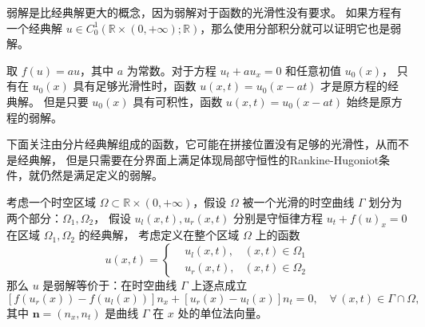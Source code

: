 弱解是比经典解更大的概念，因为弱解对于函数的光滑性没有要求。
如果方程有一个经典解 $u \in C_0^1(\mathbb{R}\times(0,+\infty);\mathbb{R})$，那么使用分部积分就可以证明它也是弱解。

\begin{example}
    取 $f(u) = a u$，其中 $a$ 为常数。对于方程 $u_t + a u_x = 0$ 和任意初值 $u_0(x)$，
    只有在 $u_0(x)$ 具有足够光滑性时，函数 $u(x,t) = u_0(x - a t)$ 才是原方程的经典解。
    但是只要 $u_0(x)$ 具有可积性，函数 $u(x,t) = u_0(x - a t)$ 始终是原方程的弱解。
\end{example}



下面关注由分片经典解组成的函数，它可能在拼接位置没有足够的光滑性，从而不是经典解，
但是只需要在分界面上满足体现局部守恒性的Rankine-Hugoniot条件，就仍然是满足定义的弱解。

\begin{theorem}\label{thm:rh-jump}
    考虑一个时空区域 $\Omega \subset \mathbb{R} \times (0,+\infty)$，假设 $\Omega$ 被一个光滑的时空曲线 $\Gamma$ 划分为两个部分：$\Omega_1,\Omega_2$，
    假设 $u_l(x,t),u_r(x,t)$ 分别是守恒律方程 $u_t + f(u)_x = 0$ 在区域 $\Omega_1,\Omega_2$ 的经典解，
    考虑定义在整个区域 $\Omega$ 上的函数
    \[
        u(x,t) =
        \left\{
        \begin{aligned}
             & u_l(x,t), & (x,t) \in \Omega_1 \\
             & u_r(x,t), & (x,t) \in \Omega_2
        \end{aligned}
        \right.
    \]
    那么 $u$ 是弱解等价于：在时空曲线 $\Gamma$ 上逐点成立
    \[
        \left[f(u_r(x)) - f(u_l(x))\right]n_x +
        \left[u_r(x) - u_l(x)\right]n_t = 0, \quad \forall\, (x,t) \in \Gamma \cap \Omega,
    \]
    其中 $\bm{n}=(n_x,n_t)$ 是曲线 $\Gamma$ 在 $x$ 处的单位法向量。
\end{theorem}

